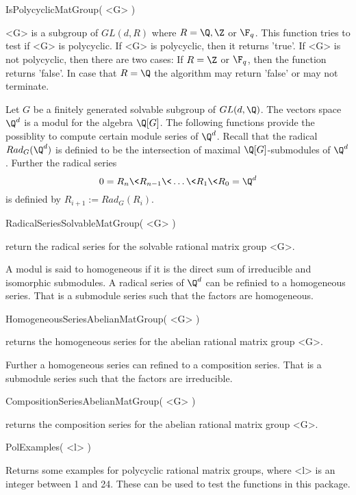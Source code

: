 \> IsPolycyclicMatGroup( <G> )

<G> is  a subgroup of $GL(d,R)$ where $R=\Q,\Z $ or $\F_q$.
 This function tries to test if <G> is polycyclic. If <G> is polycyclic,
 then it returns 'true'. 
If <G> is not polycyclic, then there are two cases: If $R=\Z$ or $\F_q$,
then the function returns 'false'. In case that $R=\Q$ the algorithm may
return 'false' or may not terminate.
 

Let $G$ be a finitely generated solvable subgroup of $GL(d,\Q)$. The vectors
space $\Q^d$ is a modul for the algebra $\Q[G]$. The following
functions provide the possiblity to compute certain module series of
$\Q^d$. Recall that the radical $Rad_G(\Q^d)$ is definied to be the
intersection of maximal $\Q[G]$-submodules of $\Q^d$. Further the
radical series 
$$
0=R_n \< R_{n-1} \< \dots \< R_1 \< R_0=\Q^d 
$$
is definied by $R_{i+1}:= Rad_G(R_i)$. 

\> RadicalSeriesSolvableMatGroup( <G> )

return the radical series for the solvable rational matrix group
<G>. 

A modul is said to homogeneous if it is the direct sum of
irreducible and isomorphic submodules. 
A radical series of $\Q^d$ can be refinied to a homogeneous series. 
That is a submodule series such that the factors are homogeneous.

\> HomogeneousSeriesAbelianMatGroup( <G> )

returns the homogeneous series for the abelian rational matrix group <G>.

Further a homogeneous series can refined to a composition series. That is
a submodule series such that the factors are irreducible.

\> CompositionSeriesAbelianMatGroup( <G> )

returns the composition series for the abelian rational matrix group <G>.


\> PolExamples( <l> )
 
Returns some examples for polycyclic rational matrix groups, where <l> 
is an integer
between 1 and 24. 
These can be used to test the functions in this package. 














